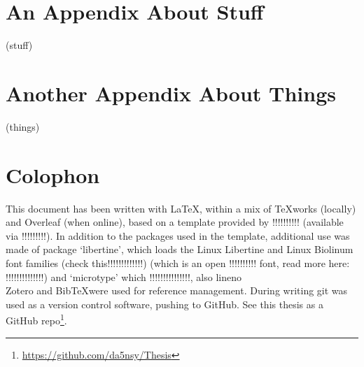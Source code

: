 
\appendix
\chapter{An Appendix About Stuff}
\label{appendixlabel1}
(stuff)

\chapter{Another Appendix About Things}
\label{appendixlabel2}
(things)

\chapter{Colophon}
\label{appendixlabel3}

This document has been written with \LaTeX, within a mix of TeXworks (locally) and Overleaf (when online), based on a template provided by !!!!!!!!!! (available via !!!!!!!!!).
In addition to the packages used in the template, additional use was made of package `libertine', which loads the Linux Libertine and Linux Biolinum font families (check this!!!!!!!!!!!!!) (which is an open !!!!!!!!!! font, read more here: !!!!!!!!!!!!!!) and `microtype' which !!!!!!!!!!!!!!!, also lineno \\
Zotero and Bib\TeX were used for reference management.
During writing git was used as a version control software, pushing to GitHub. See this thesis as a GitHub repo\footnote{\url{https://github.com/da5nsy/Thesis}}.



%

